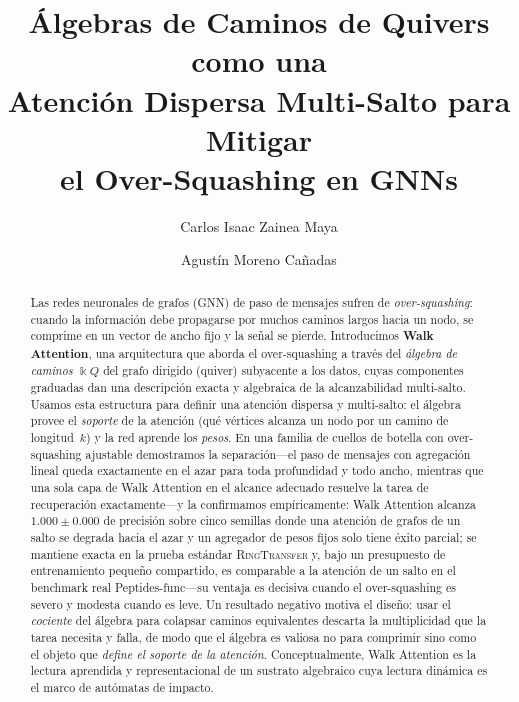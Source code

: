 \documentclass[runningheads]{llncs}
\newcommand{\kk}{\Bbbk}                 %
\newcommand{\kQ}{\kk Q}                 %
\begin{document}
\title{\'Algebras de Caminos de Quivers como una\\ Atenci\'on Dispersa Multi-Salto para Mitigar\\ el Over-Squashing en GNNs}

\author{Carlos Isaac Zainea Maya \and
Agust\'in Moreno Ca\~nadas}

\maketitle

\begin{abstract}
Las redes neuronales de grafos (GNN) de paso de mensajes sufren de
\emph{over-squashing}: cuando la informaci\'on debe propagarse por muchos caminos
largos hacia un nodo, se comprime en un vector de ancho fijo y la se\~nal se
pierde. Introducimos \textbf{Walk Attention}, una arquitectura que aborda el
over-squashing a trav\'es del \emph{\'algebra de caminos} $\kQ$ del grafo dirigido
(quiver) subyacente a los datos, cuyas componentes graduadas dan una descripci\'on
exacta y algebraica de la alcanzabilidad multi-salto. Usamos esta estructura para
definir una atenci\'on dispersa y multi-salto: el \'algebra provee el \emph{soporte}
de la atenci\'on (qu\'e v\'ertices alcanza un nodo por un camino de longitud~$k$) y
la red aprende los \emph{pesos}. En una familia de cuellos de botella con
over-squashing ajustable demostramos la separaci\'on---el paso de mensajes con
agregaci\'on lineal queda exactamente en el azar para toda profundidad y todo
ancho, mientras que una sola capa de Walk Attention en el alcance adecuado
resuelve la tarea de recuperaci\'on exactamente---y la confirmamos
emp\'iricamente: Walk Attention alcanza $1.000\pm0.000$ de precisi\'on
sobre cinco semillas donde una atenci\'on de grafos de un salto se degrada hacia
el azar y un agregador de pesos fijos solo tiene \'exito parcial; se mantiene
exacta en la prueba est\'andar \textsc{RingTransfer} y, bajo un presupuesto de
entrenamiento peque\~no compartido, es comparable a la atenci\'on de un salto en
el benchmark real Peptides-func---su ventaja es decisiva cuando el over-squashing
es severo y modesta cuando es leve. Un resultado negativo motiva
el dise\~no: usar el \emph{cociente} del \'algebra para colapsar caminos
equivalentes descarta la multiplicidad que la tarea necesita y falla, de modo que
el \'algebra es valiosa no para comprimir sino como el objeto que \emph{define el
soporte de la atenci\'on}. Conceptualmente, Walk
Attention es la lectura aprendida y representacional de un sustrato algebraico
cuya lectura din\'amica es el marco de aut\'omatas de impacto.

\end{abstract}
\end{document}
